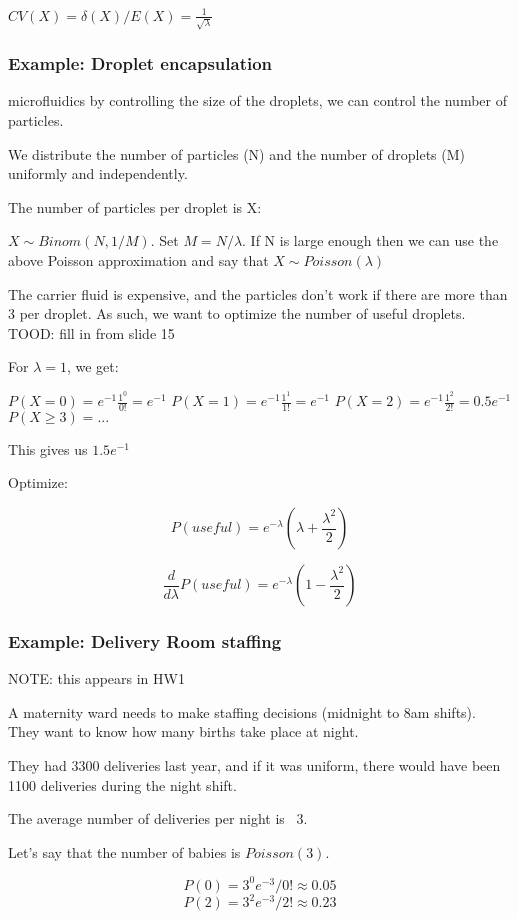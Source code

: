 \documentclass[a4paper]{article}
\begin{document}
$CV(X)=\delta(X)/E(X)=\frac{1}{\sqrt{\lambda}}$

\subsubsection{Example: Droplet encapsulation}

microfluidics by controlling the size of the droplets, we can control the number of particles.

We distribute the number of particles (N) and the number of droplets (M) uniformly and independently.

The number of particles per droplet is X:

$X\sim Binom(N, 1/M)$. Set $M=N/\lambda$. If N is large enough then we can use the above Poisson approximation and say that $X\sim Poisson(\lambda)$

The carrier fluid is expensive, and the particles don't work if there are more than 3 per droplet. As such, we want to optimize the number of useful droplets.
TOOD: fill in from slide 15

For $\lambda=1$, we get:

$P(X=0)=e^{-1}\frac{1^0}{0!}=e^{-1}$
$P(X=1)=e^{-1}\frac{1^1}{1!}=e^{-1}$
$P(X=2)=e^{-1}\frac{1^2}{2!}=0.5e^{-1}$
$P(X\ge3)=...$

This gives us $1.5e^{-1}$

Optimize:

\[P(useful) = e^{-\lambda}\left(\lambda+\frac{\lambda^2}{2}\right)\]

\[\frac{d}{d\lambda} P(useful)=e^{-\lambda}\left( 1-\frac{\lambda^2}{2} \right)\]

\subsubsection{Example: Delivery Room staffing}

NOTE: this appears in HW1

A maternity ward needs to make staffing decisions (midnight to 8am shifts). They want to know how many births take place at night.

They had 3300 deliveries last year, and if it was uniform, there would have been 1100 deliveries during the night shift.

The average number of deliveries per night is ~3.

Let's say that the number of babies is $Poisson(3)$.

\[P(0)=3^0e^{-3}/0! \approx 0.05 \]
\[P(2)=3^2e^{-3}/2! \approx 0.23 \]
\end{document}
